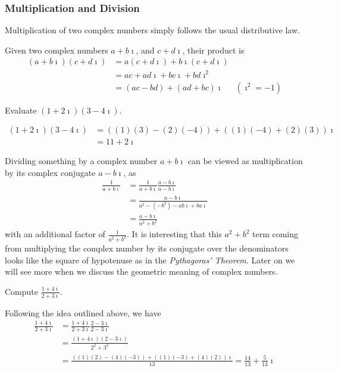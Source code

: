 \subsubsection{Multiplication and Division}
Multiplication of two complex numbers simply follows the usual distributive law.
\begin{defn}
Given two complex numbers $a + b\imath$, and $c + d\imath$, their product is
\begin{align*}
(a + b\imath)(c + d\imath) &= a(c + d\imath) + b\imath(c + d\imath)\\
&= ac + ad\imath + bc\imath + bd\imath^2 \\
&= (ac - bd) + (ad + bc)\imath & (\imath^2 = -1)
\end{align*}
\end{defn}

\begin{exmp}
Evaluate $(1+2\imath)(3-4\imath)$.
\end{exmp}
\begin{solution}
\begin{align*}
(1+2\imath)(3-4\imath) &= ((1)(3) - (2)(-4)) + ((1)(-4) + (2)(3))\imath \\
&= 11 + 2\imath
\end{align*}
\end{solution}

Dividing something by a complex number $a+b\imath$ can be viewed as multiplication by its complex conjugate $a-b\imath$, as
\begin{align*}
\frac{1}{a+b\imath} &= \frac{1}{a+b\imath}\frac{a-b\imath}{a-b\imath} \\
&= \frac{a-b\imath}{a^2 - (-b^2) - ab\imath + ba\imath} \\
&= \frac{a-b\imath}{a^2 + b^2}
\end{align*}
with an additional factor of $\frac{1}{a^2+b^2}$. It is interesting that this $a^2+b^2$ term coming from multiplying the complex number by its conjugate over the denominators looks like the square of hypotenuse as in the \textit{Pythagoras' Theorem}. Later on we will see more when we discuss the geometric meaning of complex numbers.

\begin{exmp}
Compute $\frac{1+4\imath}{2+3\imath}$.
\end{exmp}
\begin{solution}
Following the idea outlined above, we have
\begin{align*}
\frac{1+4\imath}{2+3\imath} &= \frac{1+4\imath}{2+3\imath}\frac{2-3\imath}{2-3\imath} \\
&= \frac{(1+4\imath)(2-3\imath)}{2^2+3^2} \\
&= \frac{((1)(2) - (4)(-3)) + ((1)(-3) + (4)(2))\imath}{13} = \frac{14}{13}+\frac{5}{13}\imath
\end{align*}
\end{solution}

